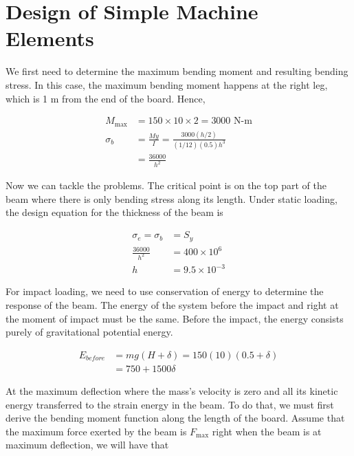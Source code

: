 \documentclass[
10pt,
a4paper,
openany,
svgnames,
]{book}
\begin{document}
\section{Design of Simple Machine Elements}

\begin{evensolution}
\item We first need to determine the maximum bending moment and resulting
  bending stress. In this case, the maximum bending moment happens at the right
  leg, which is 1 m from the end of the board. Hence,

  \begin{align*}
    M_{\max} &= 150 \times 10 \times 2 = 3000 \text{ N-m} \\
    \sigma_{b} &= \frac{My}{I} = \frac{3000(h/2)}{(1/12)(0.5)h^3 } \\
             &= \frac{36000}{h^2}
  \end{align*}

  Now we can tackle the problems. The critical point is on the top part of the
  beam where there is only bending stress along its length. Under static
  loading, the design equation for the thickness of the beam is

  \begin{align*}
    \sigma_e = \sigma_b &= S_y \\
    \frac{36000}{h^2} &= 400 \times 10^6 \\
    h &= 9.5 \times 10^{-3}
  \end{align*}

  For impact loading, we need to use conservation of energy to determine the
  response of the beam. The energy of the system before the impact and right at
  the moment of impact must be the same. Before the impact, the energy consists
  purely of gravitational potential energy.

  \begin{align*}
    E_{before} &= mg(H+\delta) = 150(10)(0.5+\delta) \\
               &= 750 + 1500 \delta
  \end{align*}

  At the maximum deflection where the mass's velocity is zero and all its
  kinetic energy transferred to the strain energy in the beam. To do that, we
  must first derive the bending moment function along the length of the board.
  Assume that the maximum force exerted by the beam is $F_{\max}$ right when the
  beam is at maximum deflection, we will have that


\end{evensolution}
\end{document}
